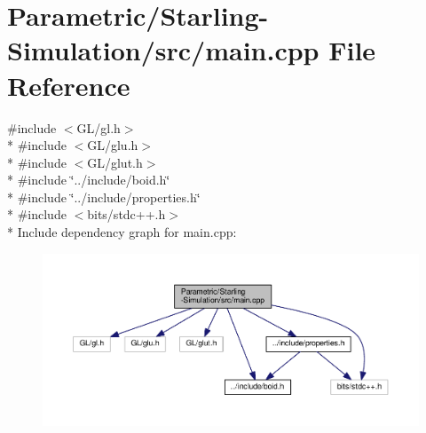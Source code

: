 \hypertarget{_parametric_2_starling-_simulation_2src_2main_8cpp}{}\section{Parametric/\+Starling-\/\+Simulation/src/main.cpp File Reference}
\label{_parametric_2_starling-_simulation_2src_2main_8cpp}
{\ttfamily \#include $<$G\+L/gl.\+h$>$}\\*
{\ttfamily \#include $<$G\+L/glu.\+h$>$}\\*
{\ttfamily \#include $<$G\+L/glut.\+h$>$}\\*
{\ttfamily \#include \char`\"{}../include/boid.\+h\char`\"{}}\\*
{\ttfamily \#include \char`\"{}../include/properties.\+h\char`\"{}}\\*
{\ttfamily \#include $<$bits/stdc++.\+h$>$}\\*
Include dependency graph for main.\+cpp\+:
\nopagebreak
\begin{figure}[H]
\begin{center}
\leavevmode
\includegraphics[width=350pt]{_parametric_2_starling-_simulation_2src_2main_8cpp__incl}
\end{center}
\end{figure}
